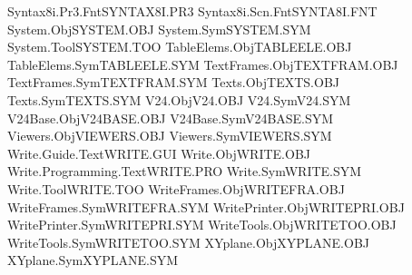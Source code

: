 Syntax8i.Pr3.Fnt                SYNTAX8I.PR3 
Syntax8i.Scn.Fnt                SYNTA8I.FNT  
System.Obj                      SYSTEM.OBJ   
System.Sym                      SYSTEM.SYM   
System.Tool                     SYSTEM.TOO   
TableElems.Obj                  TABLEELE.OBJ 
TableElems.Sym                  TABLEELE.SYM 
TextFrames.Obj                  TEXTFRAM.OBJ 
TextFrames.Sym                  TEXTFRAM.SYM 
Texts.Obj                       TEXTS.OBJ    
Texts.Sym                       TEXTS.SYM    
V24.Obj                         V24.OBJ      
V24.Sym                         V24.SYM      
V24Base.Obj                     V24BASE.OBJ  
V24Base.Sym                     V24BASE.SYM  
Viewers.Obj                     VIEWERS.OBJ  
Viewers.Sym                     VIEWERS.SYM  
Write.Guide.Text                WRITE.GUI    
Write.Obj                       WRITE.OBJ    
Write.Programming.Text          WRITE.PRO    
Write.Sym                       WRITE.SYM    
Write.Tool                      WRITE.TOO    
WriteFrames.Obj                 WRITEFRA.OBJ 
WriteFrames.Sym                 WRITEFRA.SYM 
WritePrinter.Obj                WRITEPRI.OBJ 
WritePrinter.Sym                WRITEPRI.SYM 
WriteTools.Obj                  WRITETOO.OBJ 
WriteTools.Sym                  WRITETOO.SYM 
XYplane.Obj                     XYPLANE.OBJ  
XYplane.Sym                     XYPLANE.SYM  
